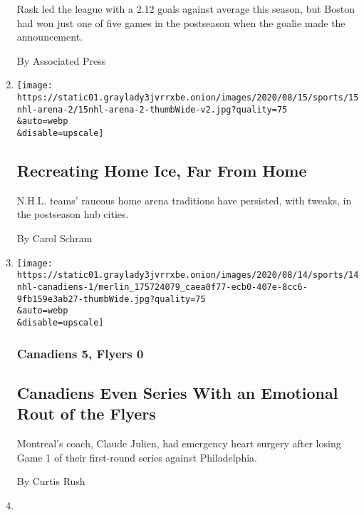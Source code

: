 \begin{enumerate}
  Rask led the league with a 2.12 goals against average this season, but
  Boston had won just one of five games in the postseason when the
  goalie made the announcement.

  By Associated Press
\item
  \href{/2020/08/15/sports/hockey/vegas-golden-knights-nhl-playoffs.html}{}

  \texttt{[image: https://static01.graylady3jvrrxbe.onion/images/2020/08/15/sports/15nhl-arena-2/15nhl-arena-2-thumbWide-v2.jpg?quality=75\\\&auto=webp\\\&disable=upscale]}

  \hypertarget{recreating-home-ice-far-from-home}{%
  \subsection{Recreating Home Ice, Far From
  Home}\label{recreating-home-ice-far-from-home}}

  N.H.L. teams' raucous home arena traditions have persisted, with
  tweaks, in the postseason hub cities.

  By Carol Schram
\item
  \href{/2020/08/14/sports/hockey/canadiens-flyers-nhl-playoffs.html}{}

  \texttt{[image: https://static01.graylady3jvrrxbe.onion/images/2020/08/14/sports/14nhl-canadiens-1/merlin\_175724079\_caea0f77-ecb0-407e-8cc6-9fb159e3ab27-thumbWide.jpg?quality=75\\\&auto=webp\\\&disable=upscale]}

  \hypertarget{canadiens-5-flyers-0}{%
  \subsubsection{Canadiens 5, Flyers 0}\label{canadiens-5-flyers-0}}

  \hypertarget{canadiens-even-series-with-an-emotional-rout-of-the-flyers}{%
  \subsection{Canadiens Even Series With an Emotional Rout of the
  Flyers}\label{canadiens-even-series-with-an-emotional-rout-of-the-flyers}}

  Montreal's coach, Claude Julien, had emergency heart surgery after
  losing Game 1 of their first-round series against Philadelphia.

  By Curtis Rush
\item
  \href{/2020/08/13/sports/hockey/nhl-qualifying-round-playoffs.html}{}


\end{enumerate}
